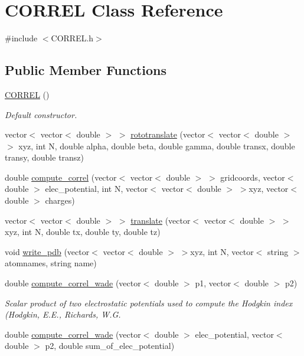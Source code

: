 \hypertarget{classCORREL}{
\section{CORREL Class Reference}
\label{classCORREL}
}


{\ttfamily \#include $<$CORREL.h$>$}

\subsection*{Public Member Functions}
\begin{DoxyCompactItemize}
\item 
\hyperlink{classCORREL_a5a1b02211831dd60a7e82e56638e75d4}{CORREL} ()
\begin{DoxyCompactList}\small\item\em Default constructor. \end{DoxyCompactList}\item 
vector$<$ vector$<$ double $>$ $>$ \hyperlink{classCORREL_aa9c602157f58ef588517aeb6b0e16ec2}{rototranslate} (vector$<$ vector$<$ double $>$ $>$ xyz, int N, double alpha, double beta, double gamma, double transx, double transy, double transz)
\item 
double \hyperlink{classCORREL_a955fa403fc704715623e06e6b6d3bb3e}{compute\_\-correl} (vector$<$ vector$<$ double $>$ $>$ gridcoords, vector$<$ double $>$ elec\_\-potential, int N, vector$<$ vector$<$ double $>$ $>$xyz, vector$<$ double $>$ charges)
\item 
vector$<$ vector$<$ double $>$ $>$ \hyperlink{classCORREL_ab2a0a4f465fc8f5fb104b1b082fcd478}{translate} (vector$<$ vector$<$ double $>$ $>$ xyz, int N, double tx, double ty, double tz)
\item 
void \hyperlink{classCORREL_a68e6a5ec851190f68e856fcb3527fccc}{write\_\-pdb} (vector$<$ vector$<$ double $>$ $>$xyz, int N, vector$<$ string $>$ atomnames, string name)
\item 
double \hyperlink{classCORREL_a0ca3a025e8493c54977c3a8d3ea72e70}{compute\_\-correl\_\-wade} (vector$<$ double $>$ p1, vector$<$ double $>$ p2)
\begin{DoxyCompactList}\small\item\em Scalar product of two electrostatic potentials used to compute the Hodgkin index (Hodgkin, E.E., Richards, W.G. \end{DoxyCompactList}\item 
double \hyperlink{classCORREL_a8f48c17b831c0fee075dcce379c80daf}{compute\_\-correl\_\-wade} (vector$<$ double $>$ elec\_\-potential, vector$<$ double $>$ p2, double sum\_\-of\_\-elec\_\-potential)
\end{DoxyCompactItemize}
